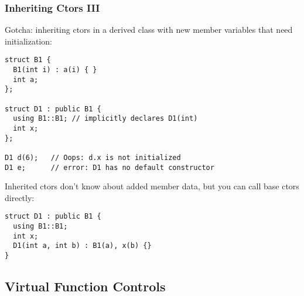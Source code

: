 \begin{frame}[fragile]
\frametitle{Inheriting Ctors III}
Gotcha: inheriting ctors in a derived class with new member variables that
need initialization:

{\scriptsize
\begin{verbatim}
struct B1 {
  B1(int i) : a(i) { }
  int a;
};

struct D1 : public B1 {
  using B1::B1; // implicitly declares D1(int)
  int x;
};

D1 d(6);   // Oops: d.x is not initialized
D1 e;      // error: D1 has no default constructor
\end{verbatim}
}

Inherited ctors don't know about added member data, but you can call
base ctors directly:
{\scriptsize
\begin{verbatim}
struct D1 : public B1 {
  using B1::B1;
  int x;
  D1(int a, int b) : B1(a), x(b) {}
}
\end{verbatim}
}

\end{frame}

\subsection{Virtual Function Controls}

